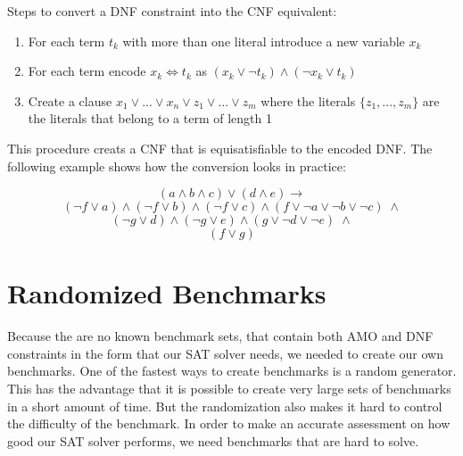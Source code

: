 \begin{leftbar}
Steps to convert a DNF constraint into the CNF equivalent:
\begin{enumerate}
\item For each term $t_k$ with more than one literal introduce a new variable $x_k$
\item For each term encode $x_k \iff t_k$ as $(x_k \vee \neg t_k) \wedge (\neg x_k \vee t_k)$ 
\item Create a clause $x_1 \vee ... \vee x_n \vee z_1 \vee ... \vee z_m$ where the literals $\{z_1,...,z_m\}$ are the literals that belong to a term of length 1
\end{enumerate}
\end{leftbar}

This procedure creats a CNF that is equisatisfiable to the encoded DNF. The following example shows how the conversion looks in practice:

\begin{leftbar}
\begin{displaymath}
(a \wedge b \wedge c) \vee (d \wedge e) \rightarrow
\end{displaymath}
\begin{displaymath}
(\neg f \vee a) \wedge (\neg f \vee b) \wedge (\neg f \vee c) \wedge (f \vee \neg a \vee \neg b \vee \neg c)\; \wedge
\end{displaymath}
\begin{displaymath}
(\neg g \vee d) \wedge (\neg g \vee e) \wedge (g \vee \neg d \vee \neg e) \; \wedge
\end{displaymath}
\begin{displaymath}
(f \vee g)
\end{displaymath}
\end{leftbar}

\section{Randomized Benchmarks}

Because the are no known benchmark sets, that contain both AMO and DNF constraints in the form that our SAT solver needs, we needed to create our own benchmarks. One of the fastest ways to create benchmarks is a random generator. This has the advantage that it is possible to create very large sets of benchmarks in a short amount of time. But the randomization also makes it hard to control the difficulty of the benchmark. In order to make an accurate assessment on how good our SAT solver performs, we need benchmarks that are hard to solve.

